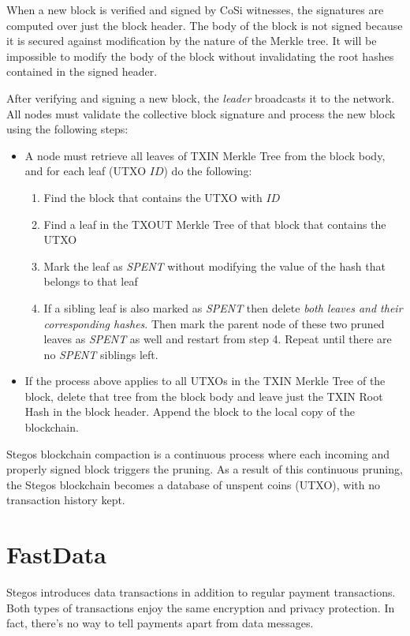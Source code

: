 \documentclass[8pt,fleqn,openany]{book}
\begin{document}
When a new block is verified and signed by CoSi witnesses, the signatures are computed over just the block header. The body of the block is not signed because it is secured against modification by the nature of the Merkle tree. It will be impossible to modify the body of the block without invalidating the root hashes contained in the signed header.

After verifying and signing a new block, the \textit{leader} broadcasts it to the network. All nodes must validate the collective block signature and process the new block using the following steps:

\begin{itemize}
  \item {A node must retrieve all leaves of TXIN Merkle Tree from the block body, and for each leaf (UTXO $ID$) do the following:
  \begin{enumerate}
    \item {Find the block that contains the UTXO with $ID$}
       \item {Find a leaf in the TXOUT Merkle Tree of that block that contains the UTXO}
    \item {Mark the leaf as \textit{SPENT} without modifying the value of the hash that belongs to that leaf}
    \item {If a sibling leaf is also marked as \textit{SPENT} then delete \textit{both leaves and their corresponding hashes}. Then mark the parent node of these two pruned leaves as \textit{SPENT} as well and restart from step 4. Repeat until there are no \textit{SPENT} siblings left.}
  \end{enumerate}} 
  \item {If the process above applies to all UTXOs in the TXIN Merkle Tree of the block, delete that tree from the block body and leave just the TXIN Root Hash in the block header. Append the block to the local copy of the blockchain.}
\end{itemize}

Stegos blockchain compaction is a continuous process where each incoming and properly signed block triggers the pruning. As a result of this continuous pruning, the Stegos blockchain becomes a database of unspent coins (UTXO), with no transaction history kept.

\section{FastData}
Stegos introduces data transactions in addition to regular payment transactions. Both types of transactions enjoy the same encryption and privacy protection. In fact, there's no way to tell payments apart from data messages. 
\end{document}
